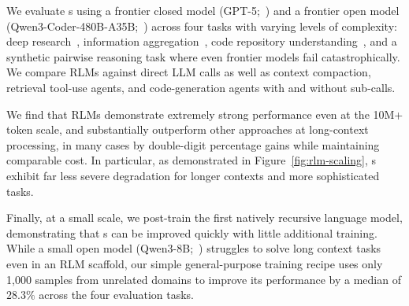 We evaluate \RLM{}s using a frontier closed model (GPT-5;~\citealt{singh2025openaigpt5card}) and a frontier open model (Qwen3-Coder-480B-A35B;~\citealt{Qwen3-Coder-480B-A35B}) across four tasks with varying levels of complexity: deep research~\citep{chen2025browsecompplusfairtransparentevaluation}, information aggregation~\citep{bertsch2025oolongevaluatinglongcontext}, code repository understanding~\citep{bai2025longbenchv2deeperunderstanding}, and a synthetic pairwise reasoning task where even frontier models fail catastrophically. We compare RLMs against direct LLM calls as well as context compaction, retrieval tool-use agents, and code-generation agents with and without sub-calls.

We find that RLMs demonstrate extremely strong performance even at the 10M+ token scale, and substantially outperform other approaches at long-context processing, in many cases by double-digit percentage gains while maintaining comparable cost. In particular, as demonstrated in Figure~\ref{fig:rlm-scaling}, \RLM{}s exhibit far less severe degradation for longer contexts and more sophisticated tasks. 

Finally, at a small scale, we post-train the first natively recursive language model, demonstrating that \RLM{}s can be improved quickly with little additional training. While a small open model (Qwen3-8B;~\citealt{yang2025qwen3technicalreport}) struggles to solve long context tasks even in an RLM scaffold, our simple general-purpose training recipe uses only 1,000 samples from unrelated domains to improve its performance by a median of $28.3\%$ across the four evaluation tasks.
